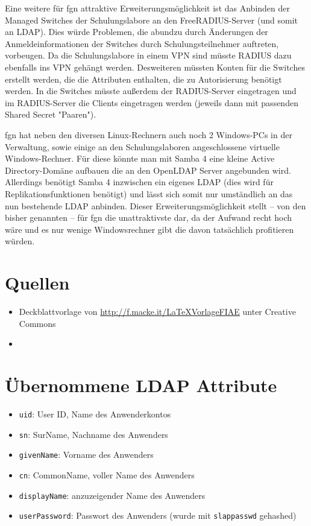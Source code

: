 \documentclass[11pt,a4paper,titlepage=firstiscover,headsepline,bibtotoc]{scrartcl} %
\newcommand{\hilight}[1]{\colorbox{yellow}{#1}} %
\begin{document}
Eine weitere für fgn attraktive Erweiterungsmöglichkeit ist das Anbinden der Managed Switches der Schulungslabore an den FreeRADIUS-Server (und somit an LDAP). Dies würde Problemen, die abundzu durch Änderungen der Anmeldeinformationen der Switches durch Schulungsteilnehmer auftreten, vorbeugen. Da die Schulungslabore in einem VPN sind müsste RADIUS dazu ebenfalls ins VPN gehängt werden. Desweiteren müssten Konten für die Switches erstellt werden, die die Attributen enthalten, die zu Autorisierung benötigt werden. In die Switches müsste außerdem der RADIUS-Server eingetragen und im RADIUS-Server die Clients eingetragen werden (jeweils dann mit passenden Shared Secret "Paaren").

fgn hat neben den diversen Linux-Rechnern auch noch 2 Windows-PCs in der Verwaltung, sowie einige an den Schulungslaboren angeschlossene virtuelle Windows-Rechner. Für diese könnte man mit Samba 4 eine kleine Active Directory-Domäne aufbauen die an den OpenLDAP Server angebunden wird. Allerdings benötigt Samba 4 inzwischen ein eigenes LDAP (dies wird für Replikationsfunktionen benötigt) und lässt sich somit nur umständlich an das nun bestehende LDAP anbinden. Dieser Erweiterungsmöglichkeit stellt -- von den bisher genannten -- für fgn die unattraktivste dar, da der Aufwand recht hoch wäre und es nur wenige Windowsrechner gibt die davon tatsächlich profitieren würden.

\newpage
\section*{Quellen}
\begin{itemize}
\item Deckblattvorlage von \url{http://f.macke.it/LaTeXVorlageFIAE} unter Creative Commons
\item 
\end{itemize}



\appendix
\newpage
{} %
\section{Übernommene LDAP Attribute} \label{sec:LDAP-Attribute}
\begin{itemize}
\item\texttt{uid}: User ID, Name des Anwenderkontos
\item\texttt{sn}: SurName, Nachname des Anwenders
\item\texttt{givenName}: Vorname des Anwenders
\item\texttt{cn}: CommonName, voller Name des Anwenders
\item\texttt{displayName}: anzuzeigender Name des Anwenders
\item\texttt{userPassword}: Passwort des Anwenders (wurde mit \texttt{slappasswd} gehashed)
\end{itemize}
\end{document}
